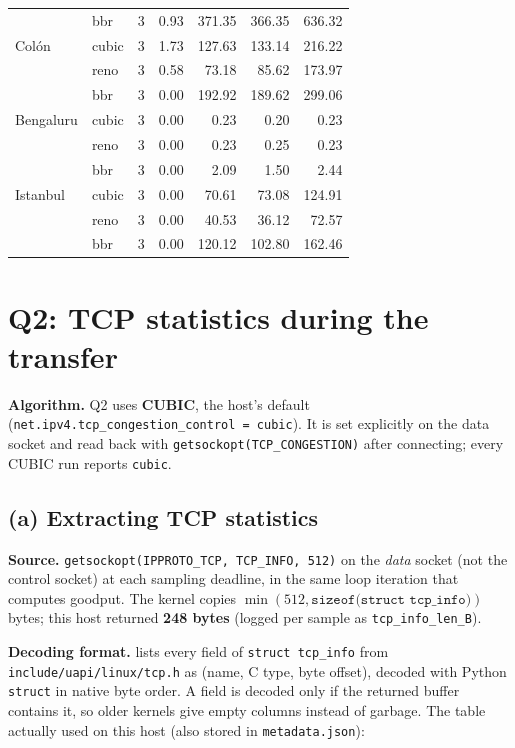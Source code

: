 \documentclass[10pt]{article}
\newcommand{\repo}{https://github.com/philwisniewski/cs-422-assignment-2}
\newcommand{\commit}{d1408ba303b1e3132ba5504e32ebf2ed3572d4e0}
\newcommand{\src}[4]{\href{\repo/blob/\commit/#1\#L#2-L#3}{\texttt{\detokenize{#4}}}}
\begin{document}
\begin{center}
\begin{longtable}{@{}llrrrrr@{}}
 & bbr & 3 & 0.93 & 371.35 & 366.35 & 636.32 \\
\addlinespace[2pt]
8 Colón & cubic & 3 & 1.73 & 127.63 & 133.14 & 216.22 \\
 & reno & 3 & 0.58 & 73.18 & 85.62 & 173.97 \\
 & bbr & 3 & 0.00 & 192.92 & 189.62 & 299.06 \\
\addlinespace[2pt]
9 Bengaluru & cubic & 3 & 0.00 & 0.23 & 0.20 & 0.23 \\
 & reno & 3 & 0.00 & 0.23 & 0.25 & 0.23 \\
 & bbr & 3 & 0.00 & 2.09 & 1.50 & 2.44 \\
\addlinespace[2pt]
10 Istanbul & cubic & 3 & 0.00 & 70.61 & 73.08 & 124.91 \\
 & reno & 3 & 0.00 & 40.53 & 36.12 & 72.57 \\
 & bbr & 3 & 0.00 & 120.12 & 102.80 & 162.46 \\
\bottomrule
\end{longtable}
\end{center}

\clearpage
\section{Q2: TCP statistics during the transfer}

\textbf{Algorithm.} Q2 uses \textbf{CUBIC}, the host's default (\texttt{net.ipv4.tcp\_congestion\_control = cubic}). It is set explicitly on the data socket and read back with \texttt{getsockopt(TCP\_CONGESTION)} after connecting; every CUBIC run reports \texttt{cubic}.

\subsection{(a) Extracting TCP statistics}

{\raggedright \textbf{Source.} \texttt{getsockopt(IPPROTO\_TCP, TCP\_INFO, 512)} on the \emph{data} socket (not the control socket) at each sampling deadline, in the same loop iteration that computes goodput. The kernel copies $\min(512, \texttt{sizeof(struct tcp\_info)})$ bytes; this host returned \textbf{248 bytes} (logged per sample as \texttt{tcp\_info\_len\_B}).\par}

\textbf{Decoding format.} \src{tcp_info.py}{36}{96}{_FIELDS} lists every field of \texttt{struct tcp\_info} from \texttt{include/uapi/linux/tcp.h} as (name, C type, byte offset), decoded with Python \texttt{struct} in native byte order. A field is decoded only if the returned buffer contains it, so older kernels give empty columns instead of garbage. The table actually used on this host (also stored in \texttt{metadata.json}):
\end{document}
